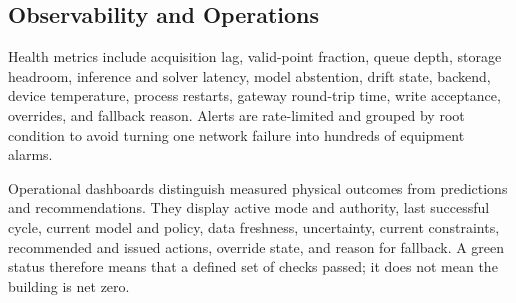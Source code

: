 \subsection{Observability and Operations}

Health metrics include acquisition lag, valid-point fraction, queue depth, storage headroom, inference and solver latency, model abstention, drift state, backend, device temperature, process restarts, gateway round-trip time, write acceptance, overrides, and fallback reason. Alerts are rate-limited and grouped by root condition to avoid turning one network failure into hundreds of equipment alarms.

Operational dashboards distinguish measured physical outcomes from predictions and recommendations. They display active mode and authority, last successful cycle, current model and policy, data freshness, uncertainty, current constraints, recommended and issued actions, override state, and reason for fallback. A green status therefore means that a defined set of checks passed; it does not mean the building is net zero.
